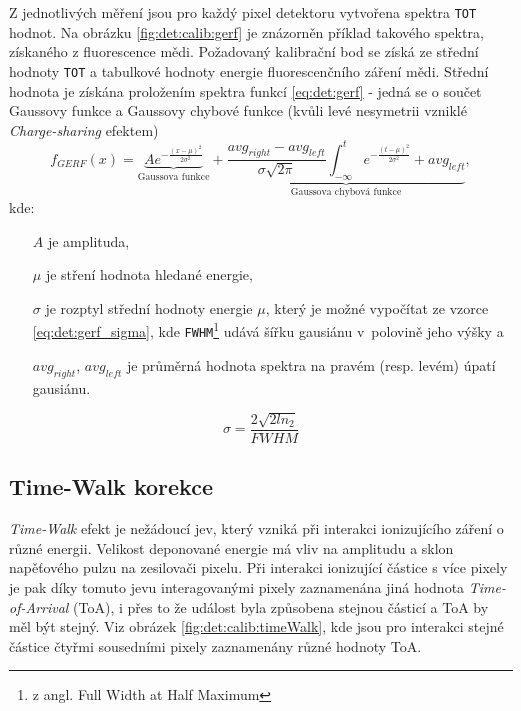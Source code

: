 Z jednotlivých měření jsou pro každý pixel detektoru vytvořena spektra \texttt{TOT} hodnot. Na obrázku \ref{fig:det:calib:gerf} je znázorněn příklad takového spektra, získaného z fluorescence mědi. Požadovaný kalibrační bod se získá ze střední hodnoty \texttt{TOT} a tabulkové hodnoty energie fluorescenčního záření mědi. Střední hodnota je získána proložením spektra funkcí \ref{eq:det:gerf} - jedná se o součet Gaussovy funkce a Gaussovy chybové funkce (kvůli levé nesymetrii vzniklé \textit{Charge-sharing} efektem)
\begin{equation}\label{eq:det:gerf}
	f_{GERF}(x) = \underbrace{Ae^{ -\frac{(x-\mu)^2}{2\sigma^2} }}_{\text{Gaussova funkce}} +
	\underbrace{ \frac{avg_{right} - avg_{left}}{\sigma\sqrt{2\pi}} \int_{-\infty}^t e^{ -\frac{(t-\mu)^2}{2\sigma^2} } + avg_{left}}_{\text{Gaussova chybová funkce}},
\end{equation}
kde:
\begin{changemargin}{1.5cm}{1cm} 
	\begin{itemize}
		\item [$A$] je amplituda,
		\item [$\mu$] je stření hodnota hledané energie,
		\item [$\sigma$] je rozptyl střední hodnoty energie $\mu$, který je možné vypočítat ze vzorce 
			\ref{eq:det:gerf_sigma}, kde \texttt{FWHM}\footnote{z angl. Full Width at Half Maximum} udává šířku gausiánu v~polovině jeho výšky a
		\item [$avg_{right}$, $avg_{left}$] je průměrná hodnota spektra na pravém (resp. levém) úpatí gausiánu.
	\end{itemize}
\end{changemargin}

\begin{equation}\label{eq:det:gerf_sigma}
	\sigma = \frac{2\sqrt{2ln_2}}{FWHM}
\end{equation}

\subsection{Time-Walk korekce}\label{chap:detectors:calibration:timeWalk}

\textit{Time-Walk} efekt je nežádoucí jev, který vzniká při interakci ionizujícího záření o různé energii. Velikost deponované energie má vliv na amplitudu a sklon napěťového pulzu na zesilovači pixelu. Při interakci ionizující částice s více pixely je pak díky tomuto jevu interagovanými pixely zaznamenána jiná hodnota \textit{Time-of-Arrival} (ToA), i přes to že událost byla způsobena stejnou částicí a ToA by měl být stejný. Viz obrázek \ref{fig:det:calib:timeWalk}, kde jsou pro interakci stejné částice čtyřmi sousedními pixely zaznamenány různé hodnoty ToA. 

